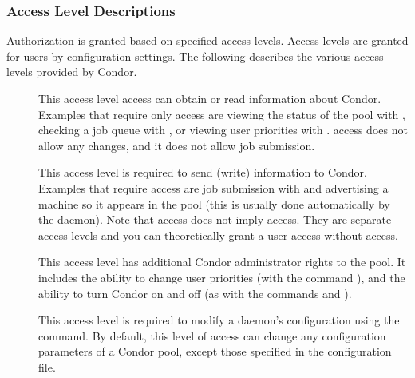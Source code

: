 \subsubsection{\label{sec:Security-access-levels}Access Level Descriptions}
Authorization is granted based on specified access levels.
Access levels are granted for users by configuration settings.
The following describes the various access levels provided
by Condor.

\begin{description}

\item[] \label{sec-level-read} This access level
   access can obtain or read information about Condor.
   Examples that require only  access are
   viewing the status of the pool with , 
   checking a job queue with ,
   or viewing user priorities with .
    access does not allow any
   changes, and it does not allow job submission.

\item[] \label{sec-level-write} This access level is
   required to send (write) information to Condor. Examples that
   require  access are job submission with
    and advertising a machine so it appears in the pool
   (this is usually done automatically by the  daemon).
   Note that  access does not imply 
   access.  They are separate access levels and you can theoretically
   grant a user  access without  access.

\item[] \label{sec-level-administrator} This
   access level has additional Condor
   administrator rights to the pool.  It includes the ability to
   change user priorities (with the command ),
   and the ability to turn Condor on and off
   (as with the commands  and ).

\item[] \label{sec-level-config} This access level is
   required to modify a daemon's configuration using
   the  command.
   By default, this level of access can
   change any configuration parameters of a Condor pool,
   except those specified in
   the  configuration file.


\end{description}
